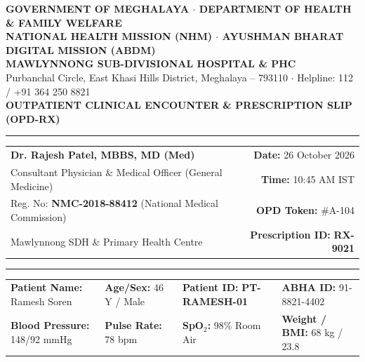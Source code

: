 \documentclass[10pt,a4paper]{article}
\begin{document}
\begin{tcolorbox}[
    colback=white,
    colframe=primary,
    arc=3mm,
    boxrule=1.5pt,
    left=10pt, right=10pt, top=8pt, bottom=8pt
]

\begin{center}
    {\scriptsize\textbf{\color{primarydark}GOVERNMENT OF MEGHALAYA $\cdot$ DEPARTMENT OF HEALTH \& FAMILY WELFARE}}\\[1pt]
    {\scriptsize\textbf{\color{accent}NATIONAL HEALTH MISSION (NHM) $\cdot$ AYUSHMAN BHARAT DIGITAL MISSION (ABDM)}}\\[4pt]
    {\Large\textbf{\color{primary}MAWLYNNONG SUB-DIVISIONAL HOSPITAL \& PHC}}\\[2pt]
    {\footnotesize Purbanchal Circle, East Khasi Hills District, Meghalaya -- 793110 $\cdot$ Helpline: 112 / +91 364 250 8821}\\[1pt]
    {\scriptsize\textbf{OUTPATIENT CLINICAL ENCOUNTER \& PRESCRIPTION SLIP (OPD-RX)}}
\end{center}

\vspace{-6pt}
\noindent\textcolor{primary}{\rule{\linewidth}{1.5pt}}

\vspace{1pt}
\begin{tabularx}{\linewidth}{@{}Xr@{}}
    \textbf{\large Dr. Rajesh Patel, MBBS, MD (Med)} & \textbf{Date:} 26 October 2026 \\
    Consultant Physician \& Medical Officer (General Medicine) & \textbf{Time:} 10:45 AM IST \\
    Reg. No: \textbf{\color{primarydark}NMC-2018-88412} (National Medical Commission) & \textbf{OPD Token:} \#A-104 \\
    Mawlynnong SDH \& Primary Health Centre & \textbf{Prescription ID:} \textbf{\color{accent}RX-9021} \\
\end{tabularx}

\vspace{2pt}
\noindent\textcolor{linegray}{\rule{\linewidth}{0.8pt}}

\vspace{2pt}
\begin{tcolorbox}[colback=lightgray, colframe=linegray, arc=2mm, boxrule=0.5pt, left=6pt, right=6pt, top=4pt, bottom=4pt]
    \begin{tabularx}{\linewidth}{@{}p{3.8cm}p{2.6cm}p{3.2cm}X@{}}
        \textbf{Patient Name:} Ramesh Soren & \textbf{Age/Sex:} 46 Y / Male & \textbf{Patient ID:} \textbf{PT-RAMESH-01} & \textbf{ABHA ID:} 91-8821-4402 \\
        \textbf{Blood Pressure:} 148/92 mmHg & \textbf{Pulse Rate:} 78 bpm & \textbf{SpO$_2$:} 98\% Room Air & \textbf{Weight / BMI:} 68 kg / 23.8 \\
    \end{tabularx}
\end{tcolorbox}


\end{tcolorbox}
\end{document}
